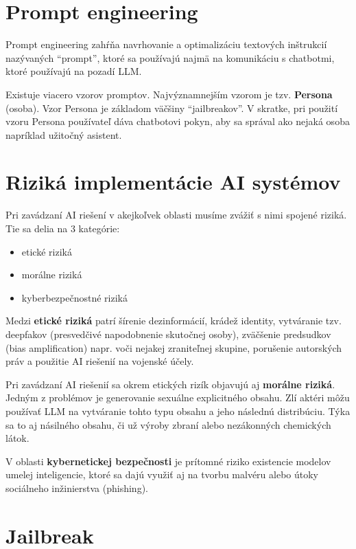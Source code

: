 \section*{Prompt engineering \label{sec:prompt_engineering_resume}}

Prompt engineering zahŕňa navrhovanie a optimalizáciu textových inštrukcií nazývaných ``prompt'', ktoré sa používajú najmä na komunikáciu s chatbotmi, ktoré používajú na pozadí LLM.

Existuje viacero vzorov promptov. Najvýznamnejším vzorom je tzv. \textbf{Persona} (osoba). Vzor Persona je základom väčšiny ``jailbreakov''. V skratke, pri použití vzoru Persona používateľ dáva chatbotovi pokyn, aby sa správal ako nejaká osoba napríklad užitočný asistent.

\section*{Riziká implementácie AI systémov \label{sec:ai_risks_resume}}

Pri zavádzaní AI riešení v akejkoľvek oblasti musíme zvážiť s nimi spojené riziká. Tie sa delia na 3 kategórie:

\begin{itemize}
    \item etické riziká
    \item morálne riziká
    \item kyberbezpečnostné riziká
\end{itemize}

Medzi \textbf{etické riziká} patrí šírenie dezinformácií, krádež identity, vytváranie tzv. deepfakov (presvedčivé napodobnenie skutočnej osoby), zväčšenie predsudkov (bias amplification) napr. voči nejakej zraniteľnej skupine, porušenie autorských práv a použitie AI riešenií na vojenské účely.

Pri zavádzaní AI riešenií sa okrem etických rizík objavujú aj \textbf{morálne riziká}. Jedným z problémov je generovanie sexuálne explicitného obsahu. Zlí aktéri môžu používať LLM na vytváranie tohto typu obsahu a jeho následnú distribúciu. Týka sa to aj násilného obsahu, či už výroby zbraní alebo nezákonných chemických látok.

V oblasti \textbf{kybernetickej bezpečnosti} je prítomné riziko existencie modelov umelej inteligencie, ktoré sa dajú využiť aj na tvorbu malvéru alebo útoky sociálneho inžinierstva (phishing).

\section*{Jailbreak \label{sec:jailbreak_resume}}

